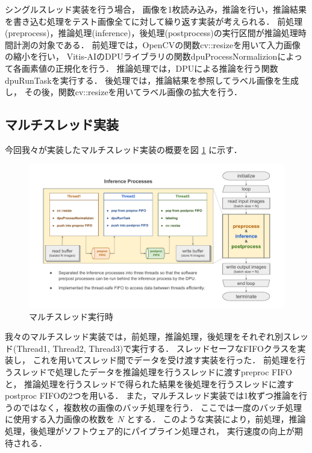 シングルスレッド実装を行う場合，
画像を1枚読み込み，推論を行い，推論結果を書き込む処理をテスト画像全てに対して繰り返す実装が考えられる．
前処理(preprocess)，推論処理(inference)，後処理(postprocess)の実行区間が推論処理時間計測の対象である．
前処理では，OpenCVの関数cv::resizeを用いて入力画像の縮小を行い，
Vitis-AIのDPUライブラリの関数dpuProcessNormalizionによって各画素値の正規化を行う．
推論処理では，DPUによる推論を行う関数dpuRunTaskを実行する．
後処理では，推論結果を参照してラベル画像を生成し，
その後，関数cv::resizeを用いてラベル画像の拡大を行う．

\subsection{マルチスレッド実装}
今回我々が実装したマルチスレッド実装の概要を図 \ref{fig:multithread} に示す．

\begin{figure}[h]
  \begin{center}
    \includegraphics[width=\linewidth]{figures/sw_opt_flowchart_multithread.pdf}
    \caption{マルチスレッド実行時}
    \label{fig:multithread}
  \end{center}
\end{figure}

我々のマルチスレッド実装では，前処理，推論処理，後処理をそれぞれ別スレッド(Thread1, Thread2, Thread3)で実行する．
スレッドセーフなFIFOクラスを実装し，
これを用いてスレッド間でデータを受け渡す実装を行った．
前処理を行うスレッドで処理したデータを推論処理を行うスレッドに渡すpreproc FIFOと，
推論処理を行うスレッドで得られた結果を後処理を行うスレッドに渡すpostproc FIFOの2つを用いる．
また，マルチスレッド実装では1枚ずつ推論を行うのではなく，複数枚の画像のバッチ処理を行う．
ここでは一度のバッチ処理に使用する入力画像の枚数を $N$ とする．
このような実装により，前処理，推論処理，後処理がソフトウェア的にパイプライン処理され，
実行速度の向上が期待される．

